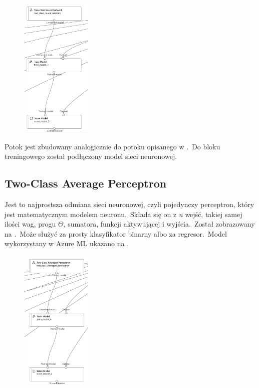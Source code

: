 \begin{figure}[H]
    \centering
    \includegraphics[width=0.3\textwidth]{images/nn_pipe}
    \label{fig:nn-pipe}
\end{figure}

Potok jest zbudowany analogicznie do potoku opisanego w .\ Do bloku treningowego został podłączony model sieci neuronowej.

\subsection{Two-Class Average Perceptron}
Jest to najprostsza odmiana sieci neuronowej, czyli pojedynczy perceptron, który jest matematycznym modelem neuronu.\ Składa się on z \textit{n} wejść, takiej samej ilości wag, progu $\Theta$, sumatora, funkcji aktywującej i wyjścia.\ Został zobrazowany na .\ Może służyć za prosty klasyfikator binarny albo za regresor.\ Model wykorzystany w Azure ML ukazano na .

\begin{figure}[H]
    \centering
    \includegraphics[width=0.3\textwidth]{images/ap_pipe}
    \label{fig:ap-pipe}
\end{figure}

